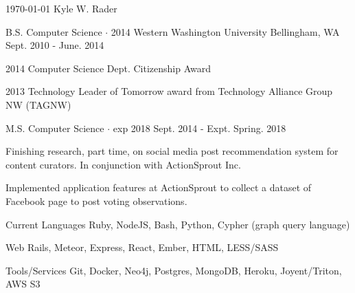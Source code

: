 \documentclass[11pt, a4paper]{awesome-cv}
\begin{document}
\makecvheader

\makecvfooter
  {\today}
  {Kyle W. Rader}
  {\thepage}

\begin{cventries}
  \cventry
    {B.S. Computer Science $\cdot$ 2014} %
    {Western Washington University} %
    {Bellingham, WA} %
    {Sept. 2010 - June. 2014} %
    {
      \begin{cvitems} %
        \item {2014 Computer Science Dept. Citizenship Award}
        \item {2013 Technology Leader of Tomorrow award from Technology Alliance Group NW (TAGNW)}
      \end{cvitems}
    }
    {}

  \cventry
    {M.S. Computer Science $\cdot$ exp 2018} %
    { } %
    { } %
    {Sept. 2014 - Expt. Spring. 2018} %
    {
      \begin{cvitems} %
        \item {Finishing research, part time, on social media post recommendation system for content curators. In conjunction with ActionSprout Inc.}
        \item {Implemented application features at ActionSprout to collect a dataset of Facebook page to post voting observations.}
      \end{cvitems}
    }
    {}

\end{cventries}

\begin{cvskills}
  \cvskill
    {Current Languages} %
    {Ruby, NodeJS, Bash, Python, Cypher (graph query language)} %

  \cvskill
    {Web} %
    {Rails, Meteor, Express, React, Ember, HTML, LESS/SASS} %

  \cvskill
    {Tools/Services} %
    {Git, Docker, Neo4j, Postgres, MongoDB, Heroku, Joyent/Triton, AWS S3 } %
\end{cvskills}
\end{document}

